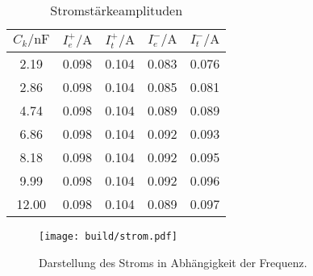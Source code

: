 \begin{table}
    \centering
    \caption{Stromstärkeamplituden}
    \label{tab:I}
    \begin{tabular}{c c c c c}
    \toprule
    $C_k / \si{\nano\farad}$ & $I_e^+ / \si{\ampere}$ & $I_t^+ / \si{\ampere}$ & $I_e^- / \si{\ampere}$ & $I_t^- / \si{\ampere}$ \\
    \midrule
     2.19 & 0.098 & 0.104 & 0.083 & 0.076 \\
     2.86 & 0.098 & 0.104 & 0.085 & 0.081 \\
     4.74 & 0.098 & 0.104 & 0.089 & 0.089 \\
     6.86 & 0.098 & 0.104 & 0.092 & 0.093 \\
     8.18 & 0.098 & 0.104 & 0.092 & 0.095 \\
     9.99 & 0.098 & 0.104 & 0.092 & 0.096 \\
    12.00 & 0.098 & 0.104 & 0.089 & 0.097 \\
    \bottomrule
    \end{tabular}
\end{table}


\begin{figure}

    \centering
    \texttt{[image: build/strom.pdf]}
    \caption{Darstellung des Stroms in Abhängigkeit der Frequenz.}
    \label{fig:strom}
\end{figure}




